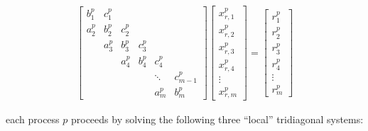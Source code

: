 \documentclass{elsarticle}
\begin{document}
\begin{align}
& \begin{bmatrix}
b_1^p & c_1^p \\
a_2^p & b_2^p & c_2^p \\
      & a_3^p & b_3^p & c_3^p \\
      &       & a_4^p & b_4^p & c_4^p \\
      &       &       &       &  \ddots & c_{m-1}^p\\
      &       &       &       &     a_{m}^p  & b_{m}^p
\end{bmatrix}
\begin{bmatrix}
x_{r,1}^p \\
x_{r,2}^p \\
x_{r,3}^p \\
x_{r,4}^p \\
\vdots \\
x_{r,m}^p
\end{bmatrix}
=
\begin{bmatrix}
r_1^p \\
r_2^p \\
r_3^p \\
r_4^p \\
\vdots \\
r_m^p
\end{bmatrix} & \label{eqn:global-system} 
\end{align}

each process $p$ proceeds by solving the following three ``local''
tridiagonal systems:
\end{document}
